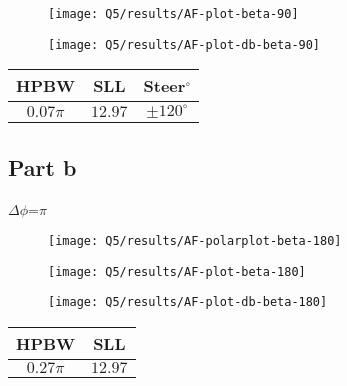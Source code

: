 \documentclass[12pt,onecolumn,a4paper]{article}
\begin{document}
\begin{figure}[H] 
	\centering
	\texttt{[image: Q5/results/AF-plot-beta-90]}
	\caption{}
	\label{fig:af-plot-beta-90}
\end{figure}

\begin{figure}[H] 
	\centering
	\texttt{[image: Q5/results/AF-plot-db-beta-90]}
	\caption{}
	\label{fig:af-plot-db-beta-90}
\end{figure}


\begin{table}[H]
	\centering
	\begin{tabular}{ccc}
		\toprule
		\textbf{HPBW} & \textbf{SLL} & \textbf{Steer$^\circ$}\\
		\midrule
		$0.07 \pi$ & $12.97$ & $\pm 120^\circ$\\
		\bottomrule
	\end{tabular}
\end{table}


\subsection{Part b}
{\color{questioncolor}
$\Delta\phi$=$\pi$\\
}


\begin{figure}[H]
	\centering
	\texttt{[image: Q5/results/AF-polarplot-beta-180]}
	\caption{}
	\label{fig:af-polarplot-beta-180}
\end{figure}

\begin{figure}[H] 
	\centering
	\texttt{[image: Q5/results/AF-plot-beta-180]}
	\caption{}
	\label{fig:af-plot-beta-180}
\end{figure}

\begin{figure}[H] 
	\centering
	\texttt{[image: Q5/results/AF-plot-db-beta-180]}
	\caption{}
	\label{fig:af-plot-db-beta-180}
\end{figure}



\begin{table}[H]
	\centering
	\begin{tabular}{cc}
		\toprule
		\textbf{HPBW} & \textbf{SLL} \\
		\midrule
		$0.27 \pi$ & $12.97$ \\
		\bottomrule
	\end{tabular}
\end{table}
\end{document}
